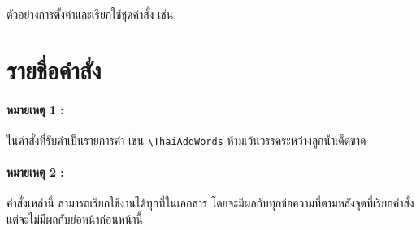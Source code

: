 ตัวอย่างการตั้งค่าและเรียกใช้ชุดคำสั่ง เช่น
\begin{texsource}{}
\usepackage[
  interword-expansion=true,
  interword-stretch=0.5,
  interword-shrink=0.2,
  intercluster-stretch=0,
  dictionary=dict.txt,
  tcc-min-edge=3,
]{thai-segmentation}
\end{texsource}

\section{รายชื่อคำสั่ง}
\label{sec:available-commands}

\paragraph{หมายเหตุ 1 :}

ในคำสั่งที่รับค่าเป็นรายการคำ เช่น \texttt{\textbackslash ThaiAddWords}
ห้ามเว้นวรรคระหว่างลูกน้ำเด็ดขาด

\paragraph{หมายเหตุ 2 :}

คำสั่งเหล่านี้ สามารถเรียกใช้งานได้ทุกที่ในเอกสาร
โดยจะมีผลกับทุกข้อความที่ตามหลังจุดที่เรียกคำสั่ง
แต่จะไม่มีผลกับย่อหน้าก่อนหน้านี้

